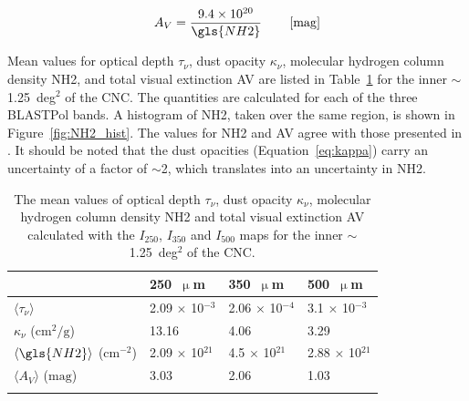 \begin{equation}\label{eq:Av}
A_{V} = \frac{ 9.4 \times 10^{20}}{\gls{NH2}} \qquad \left[ \mathrm{mag} \right]
\end{equation}

Mean values for optical depth $\tau_{\nu}$, dust opacity $\kappa_{\nu}$, molecular hydrogen column density \gls{NH2}, and total visual extinction \gls{AV} are listed in Table~\ref{table:NH2_fit} for the inner $\sim$1.25~deg$^{2}$ of the CNC\@. The quantities are calculated for each of the three BLASTPol bands. A histogram of \gls{NH2}, taken over the same region, is shown in Figure~\ref{fig:NH2_hist}. The values for \gls{NH2} and \gls{AV} agree with those presented in \citet{preibisch2012herschel}. It should be noted that the dust opacities (Equation~\ref{eq:kappa}) carry an uncertainty of a factor of $\sim$2, which translates into an uncertainty in \gls{NH2}.


\begin{table}[!htbp]
  \centering
\begin{tabular}{@{}llll@{}}
\dtoprule{}
      & 250~$\upmu$m                              & 350~$\upmu$m       & 500~$\upmu$m              \\ \midrule
$\langle \tau_{\nu}  \rangle$  & 2.09 $\times$ 10$^{-3}$ & 2.06 $\times$ 10$^{-4}$ & 3.1 $\times$ 10$^{-3}$  \\
$\kappa_{\nu}$ ($\mathrm{cm}^{2}/\mathrm{g}$)    & 13.16             & 4.06     & 3.29                    \\
$\langle \gls{NH2}  \rangle$  ($\mathrm{cm}^{-2}$) & 2.09 $\times$ 10$^{21}$                 & 4.5 $\times$ 10$^{21}$                 & 2.88 $\times$ 10$^{21}$ \\
$\langle A_{V} \rangle$  ($\mathrm{mag}$)                              & 3.03                   & 2.06                   & 1.03                    \\ \dbottomrule{}
\\
\end{tabular}
\centering
\caption[~Estimated map parameters calculated using total intensity maps over the inner  of the CNC.]{The mean values of optical depth $\tau_{\nu}$, dust opacity $\kappa_{\nu}$, molecular hydrogen column density \gls{NH2} and total visual extinction \gls{AV} calculated with the $I_{250}$, $I_{350}$ and $I_{500}$ maps for the inner $\sim$1.25~deg$^{2}$ of the CNC.}
\label{table:NH2_fit}
\end{table}

